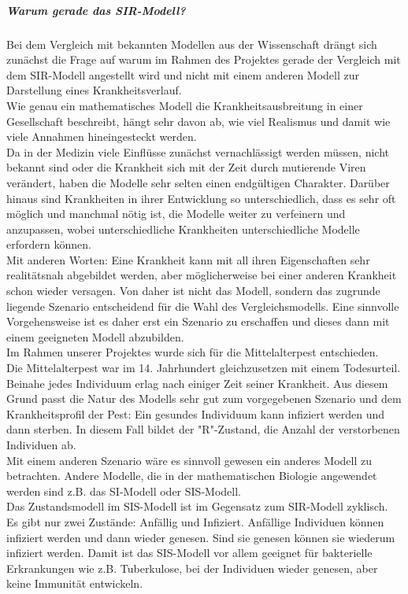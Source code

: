 \subparagraph{Warum gerade das SIR-Modell?}
Bei dem Vergleich mit bekannten Modellen aus der Wissenschaft drängt sich zunächst die Frage auf warum im Rahmen des Projektes gerade der Vergleich mit dem SIR-Modell angestellt wird und nicht mit einem anderen Modell zur Darstellung eines Krankheitsverlauf.\\
Wie genau ein mathematisches Modell die Krankheitsausbreitung in einer Gesellschaft beschreibt, hängt sehr davon ab, wie viel Realismus und damit wie viele Annahmen hineingesteckt werden.\\
Da in der Medizin viele Einflüsse zunächst vernachlässigt werden müssen, nicht bekannt sind oder die Krankheit sich mit der Zeit durch mutierende Viren verändert, haben die Modelle sehr selten einen endgültigen Charakter. Darüber hinaus sind Krankheiten in ihrer Entwicklung so unterschiedlich, dass es sehr oft möglich und manchmal nötig ist, die Modelle weiter zu verfeinern und anzupassen, wobei unterschiedliche Krankheiten unterschiedliche Modelle erfordern können. 
\cite{sebM}\\
Mit anderen Worten: Eine Krankheit kann mit all ihren Eigenschaften sehr realitätsnah abgebildet werden, aber möglicherweise bei einer anderen Krankheit schon wieder versagen. Von daher ist nicht das Modell, sondern das zugrunde liegende Szenario entscheidend für die Wahl des Vergleichsmodells. Eine sinnvolle Vorgehensweise ist es daher erst ein Szenario zu erschaffen und dieses dann mit einem geeigneten Modell abzubilden.\\ 
Im Rahmen unserer Projektes wurde sich für die Mittelalterpest entschieden.\\ 
Die Mittelalterpest war im 14. Jahrhundert gleichzusetzen mit einem Todesurteil. Beinahe jedes Individuum erlag nach einiger Zeit seiner Krankheit. Aus diesem Grund passt die Natur des Modells sehr gut zum vorgegebenen Szenario und dem Krankheitsprofil der Pest: Ein gesundes Individuum kann infiziert werden und dann sterben. In diesem Fall bildet der "R"-Zustand, die Anzahl der verstorbenen Individuen ab.\\
Mit einem anderen Szenario wäre es sinnvoll gewesen ein anderes Modell zu betrachten. 
Andere Modelle, die in der mathematischen Biologie angewendet werden sind z.B. das SI-Modell oder SIS-Modell.\\
Das Zustandsmodell im SIS-Modell ist im Gegensatz zum SIR-Modell zyklisch. Es gibt nur zwei Zustände: Anfällig und Infiziert. Anfällige Individuen können infiziert werden und dann wieder genesen. Sind sie genesen können sie wiederum infiziert werden. Damit ist das SIS-Modell vor allem geeignet für bakterielle Erkrankungen wie z.B. Tuberkulose, bei der Individuen wieder genesen, aber keine Immunität entwickeln. \\
